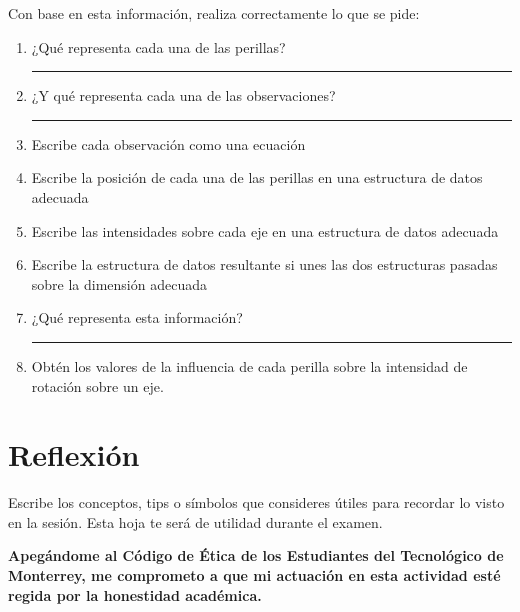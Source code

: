 \documentclass[spanish, 10pt]{article}
\newcommand{\shortresponserule}{{\large\rule{5 cm}{0.3mm}}}
\begin{document}
Con base en esta información, realiza correctamente lo que se pide:

\begin{enumerate}
    \item ¿Qué representa cada una de las perillas? \hfill \shortresponserule
    \item ¿Y qué representa cada una de las observaciones? \hfill \shortresponserule
    \item Escribe cada observación como una ecuación
    \vspace{11ex}
    \item Escribe la posición de cada una de las perillas en una estructura de datos adecuada
    \vspace{11ex}
    \item Escribe las intensidades sobre cada eje en una estructura de datos adecuada
    \vspace{11ex}
    \item Escribe la estructura de datos resultante si unes las dos estructuras pasadas sobre la dimensión adecuada
    \vspace{11ex}
    \item ¿Qué representa esta información? \hfill \shortresponserule
    \item Obtén los valores de la influencia de cada perilla sobre la intensidad de rotación sobre un eje.
\end{enumerate}

\vspace{10cm}

\section{Reflexión}

Escribe los conceptos, tips o símbolos que consideres útiles para recordar lo visto en la sesión. Esta hoja te será de utilidad durante el examen.

\vfill

\textbf{Apegándome al Código de Ética de los Estudiantes del Tecnológico de Monterrey, me comprometo a que mi actuación en esta actividad esté regida por la honestidad académica.}
\end{document}
